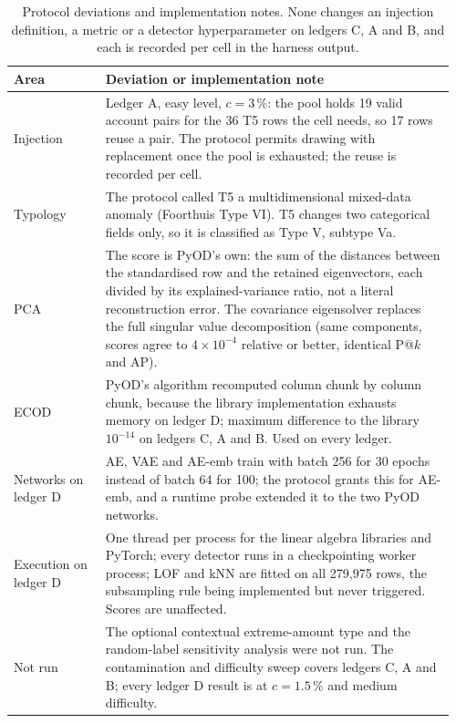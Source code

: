 \begin{table}[tbp]
\caption{Protocol deviations and implementation notes. None changes an injection definition, a metric or a detector hyperparameter on ledgers C, A and B, and each is recorded per cell in the harness output.}
\label{tab:s-deviations}
\centering
\footnotesize
\begin{tabular}{@{}>{\raggedright\arraybackslash}p{0.2\linewidth}>{\raggedright\arraybackslash}p{0.76\linewidth}@{}}
\toprule
Area & Deviation or implementation note \\
\midrule
Injection & Ledger A, easy level, $c = 3$\,\%: the pool holds 19 valid account pairs for the 36 T5 rows the cell needs, so 17 rows reuse a pair. The protocol permits drawing with replacement once the pool is exhausted; the reuse is recorded per cell. \\
Typology & The protocol called T5 a multidimensional mixed-data anomaly (Foorthuis Type VI). T5 changes two categorical fields only, so it is classified as Type V, subtype Va. \\
PCA & The score is PyOD's own: the sum of the distances between the standardised row and the retained eigenvectors, each divided by its explained-variance ratio, not a literal reconstruction error. The covariance eigensolver replaces the full singular value decomposition (same components, scores agree to $4\times10^{-4}$ relative or better, identical P@$k$ and AP). \\
ECOD & PyOD's algorithm recomputed column chunk by column chunk, because the library implementation exhausts memory on ledger D; maximum difference to the library $10^{-14}$ on ledgers C, A and B. Used on every ledger. \\
Networks on ledger D & AE, VAE and AE-emb train with batch 256 for 30 epochs instead of batch 64 for 100; the protocol grants this for AE-emb, and a runtime probe extended it to the two PyOD networks. \\
Execution on ledger D & One thread per process for the linear algebra libraries and PyTorch; every detector runs in a checkpointing worker process; LOF and kNN are fitted on all 279,975 rows, the subsampling rule being implemented but never triggered. Scores are unaffected. \\
Not run & The optional contextual extreme-amount type and the random-label sensitivity analysis were not run. The contamination and difficulty sweep covers ledgers C, A and B; every ledger D result is at $c = 1.5$\,\% and medium difficulty. \\

\end{tabular}
\end{table}
